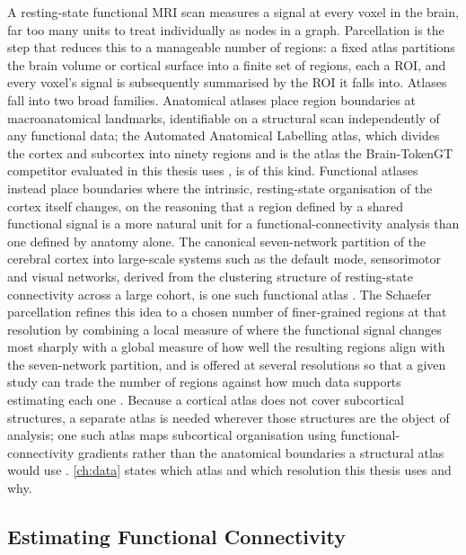 A resting-state functional \ac{MRI} scan measures a signal at every voxel in the brain,
far too many units to treat individually as nodes in a graph. Parcellation is the step
that reduces this to a manageable number of regions: a fixed atlas partitions the brain
volume or cortical surface into a finite set of regions, each a \ac{ROI}, and every
voxel's signal is subsequently summarised by the \ac{ROI} it falls into. Atlases fall into
two broad families.
Anatomical atlases place region boundaries at macroanatomical landmarks, identifiable on a
structural scan independently of any functional data; the Automated Anatomical Labelling
atlas, which divides the cortex and subcortex into ninety regions and is the atlas the
Brain-TokenGT competitor evaluated in this thesis uses \parencite{dong2023braintokengt}, is
of this kind. Functional atlases instead place boundaries where the intrinsic, resting-state
organisation of the cortex itself changes, on the reasoning that a region defined by a
shared functional signal is a more natural unit for a functional-connectivity analysis than
one defined by anatomy alone. The canonical seven-network partition of the cerebral cortex
into large-scale systems such as the default mode, sensorimotor and visual networks, derived
from the clustering structure of resting-state connectivity across a large cohort, is one
such functional atlas \parencite{yeo2011organization}. The Schaefer parcellation refines
this idea to a chosen number of finer-grained regions at that resolution by combining a local measure of
where the functional signal changes most sharply with a global measure of how well the
resulting regions align with the seven-network partition, and is offered at several
resolutions so that a given study can trade the number of regions against how much data
supports estimating each one \parencite{schaefer2018parcellation}. Because a cortical
atlas does not cover subcortical structures, a separate atlas is needed wherever those
structures are the object of analysis; one such atlas maps subcortical organisation using
functional-connectivity gradients rather than the anatomical boundaries a structural atlas
would use \parencite{tian2020subcortex}. \autoref{ch:data} states which atlas and which
resolution this thesis uses and why.

\subsection{Estimating Functional Connectivity}\label{sec:fc-estimation}

